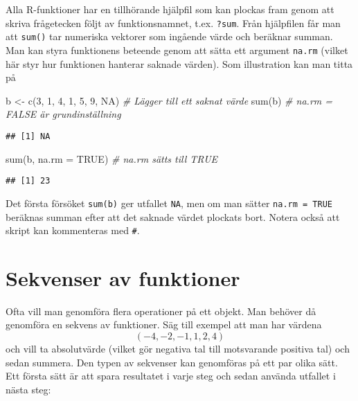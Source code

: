 \documentclass[
]{book}
\newenvironment{Shaded}{\begin{snugshade}}{\end{snugshade}}
\newcommand{\AttributeTok}[1]{\textcolor[rgb]{0.77,0.63,0.00}{#1}}
\newcommand{\CommentTok}[1]{\textcolor[rgb]{0.56,0.35,0.01}{\textit{#1}}}
\newcommand{\ConstantTok}[1]{\textcolor[rgb]{0.00,0.00,0.00}{#1}}
\newcommand{\DecValTok}[1]{\textcolor[rgb]{0.00,0.00,0.81}{#1}}
\newcommand{\FunctionTok}[1]{\textcolor[rgb]{0.00,0.00,0.00}{#1}}
\newcommand{\NormalTok}[1]{#1}
\newcommand{\OtherTok}[1]{\textcolor[rgb]{0.56,0.35,0.01}{#1}}
\theoremstyle{definition}
\theoremstyle{definition}
\theoremstyle{definition}
\theoremstyle{definition}
\theoremstyle{remark}
\begin{document}
Alla R-funktioner har en tillhörande hjälpfil som kan plockas fram genom att skriva frågetecken följt av funktionsnamnet, t.ex. \texttt{?sum}. Från hjälpfilen får man att \texttt{sum()} tar numeriska vektorer som ingående värde och beräknar summan. Man kan styra funktionens beteende genom att sätta ett argument \texttt{na.rm} (vilket här styr hur funktionen hanterar saknade värden). Som illustration kan man titta på

\begin{Shaded}
\begin{Highlighting}[]
\NormalTok{b }\OtherTok{\textless{}{-}} \FunctionTok{c}\NormalTok{(}\DecValTok{3}\NormalTok{, }\DecValTok{1}\NormalTok{, }\DecValTok{4}\NormalTok{, }\DecValTok{1}\NormalTok{, }\DecValTok{5}\NormalTok{, }\DecValTok{9}\NormalTok{, }\ConstantTok{NA}\NormalTok{)           }\CommentTok{\# Lägger till ett saknat värde}
\FunctionTok{sum}\NormalTok{(b)                                 }\CommentTok{\# na.rm = FALSE är grundinställning}
\end{Highlighting}
\end{Shaded}

\begin{verbatim}
## [1] NA
\end{verbatim}

\begin{Shaded}
\begin{Highlighting}[]
\FunctionTok{sum}\NormalTok{(b, }\AttributeTok{na.rm =} \ConstantTok{TRUE}\NormalTok{)                   }\CommentTok{\# na.rm sätts till TRUE}
\end{Highlighting}
\end{Shaded}

\begin{verbatim}
## [1] 23
\end{verbatim}

Det första försöket \texttt{sum(b)} ger utfallet \texttt{NA}, men om man sätter \texttt{na.rm\ =\ TRUE} beräknas summan efter att det saknade värdet plockats bort. Notera också att skript kan kommenteras med \texttt{\#}.

\hypertarget{sekvenser-av-funktioner}{%
\section{Sekvenser av funktioner}\label{sekvenser-av-funktioner}}

Ofta vill man genomföra flera operationer på ett objekt. Man behöver då genomföra en sekvens av funktioner. Säg till exempel att man har värdena \[(-4, -2, -1, 1, 2, 4)\] och vill ta absolutvärde (vilket gör negativa tal till motsvarande positiva tal) och sedan summera.
Den typen av sekvenser kan genomföras på ett par olika sätt. Ett första sätt är att spara resultatet i varje steg och sedan använda utfallet i nästa steg:
\end{document}
